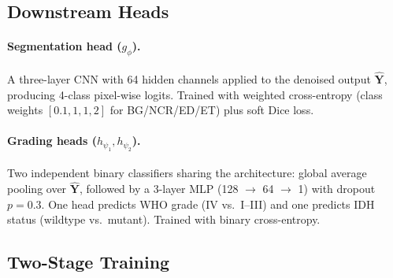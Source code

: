 \documentclass[runningheads]{llncs}
\begin{document}
\subsection{Downstream Heads}

\paragraph{Segmentation head ($g_\phi$).}
A three-layer CNN with 64 hidden channels applied to the denoised
output $\hat{\bm{Y}}$, producing 4-class pixel-wise logits.
Trained with weighted cross-entropy (class weights $[0.1,1,1,2]$
for BG/NCR/ED/ET) plus soft Dice loss.

\paragraph{Grading heads ($h_{\psi_1}, h_{\psi_2}$).}
Two independent binary classifiers sharing the architecture:
global average pooling over $\hat{\bm{Y}}$, followed by a 3-layer
MLP (128 $\to$ 64 $\to$ 1) with dropout~$p{=}0.3$.
One head predicts WHO grade (IV vs.\ I–III) and one predicts IDH
status (wildtype vs.\ mutant). Trained with binary cross-entropy.

\subsection{Two-Stage Training}
\label{subsec:stages}

\begin{algorithm}[tb]
\SetAlgoLined\DontPrintSemicolon
{}


\caption{PP-MAE Two-Stage Training ($\alpha{=}1.0,\;\beta{=}0.5$)}
\label{alg:train}
\end{algorithm}
\end{document}
